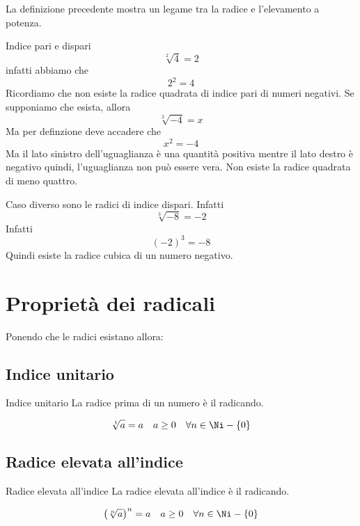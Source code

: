 La definizione precedente mostra un legame tra la radice e l'elevamento a potenza. 
\begin{esempiot}{Indice pari e dispari}{}
\[\sqrt[2]{4}=2\]infatti abbiamo che \[2^2=4\]
Ricordiamo che non esiste la radice quadrata di indice pari di numeri negativi. Se supponiamo che esista, allora \[\sqrt[2]{-4}=x\] Ma per definzione deve accadere che \[x^2=-4\]
Ma il lato sinistro dell'uguaglianza è una quantità positiva mentre il lato destro è negativo quindi, l'uguaglianza non può essere vera. Non esiste la radice quadrata di meno quattro.

Caso diverso sono le radici di indice dispari. Infatti \[\sqrt[3]{-8}=-2\]Infatti \[(-2)^3=-8\]
Quindi esiste la radice cubica di un numero negativo.
\end{esempiot}
\section{Proprietà dei radicali}
Ponendo che le radici esistano allora:
\subsection{Indice unitario}
\begin{proprietat}{Indice unitario}{}
La radice prima di un numero è il radicando.
\end{proprietat}
\[\sqrt[1]{a}=a\quad a\geq 0\quad\forall n\in\Ni-\lbrace0\rbrace\]
\subsection{Radice elevata all'indice}
\begin{proprietat}{Radice elevata all'indice}{}
	La radice elevata all'indice è il radicando.
\end{proprietat}
\[\left(\sqrt[n]{a}\right)^n=a\quad a\geq 0\quad\forall n\in\Ni-\lbrace 0\rbrace\]
